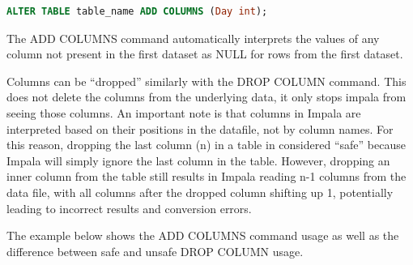 \documentclass[onecolumn, draftclsnofoot,10pt, compsoc]{IEEEtran}
\begin{document}
    \begin{center}
    \begin{lstlisting}[language=SQL]
ALTER TABLE table_name ADD COLUMNS (Day int);
\end{lstlisting}
\end{center}


The ADD COLUMNS command automatically interprets the values of any column not present in the first dataset as NULL for rows from the first dataset. 

Columns can be “dropped” similarly with the DROP COLUMN command. 
This does not delete the columns from the underlying data, it only stops impala from seeing those columns.
An important note is that columns in Impala are interpreted based on their positions in the datafile, not by column names.
For this reason, dropping the last column (n) in a table in considered “safe” because Impala will simply ignore the last column in the table. 
However, dropping an inner column from the table still results in Impala reading n-1 columns from the data file, with all columns after the dropped column shifting up 1, potentially leading to incorrect results and conversion errors. 

The example below shows the ADD COLUMNS command usage as well as the difference between safe and unsafe DROP COLUMN usage.
\end{document}
